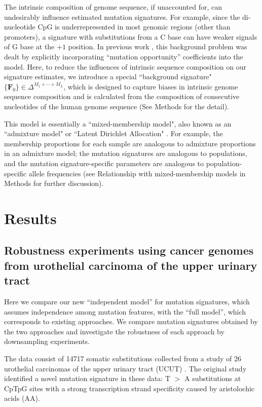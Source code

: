 \documentclass[10pt,letterpaper]{article}
\begin{document}
The intrinsic composition of genome sequence, if unaccounted for, can undesirably influence estimated mutation signatures.
For example, since the di-nucleotide CpG is underrepresented in most genomic regions (other than promoters), 
a signature with substitutions from a C base can have weaker signals of G base at the $+1$ position.
In previous work \cite{pmid23628380}, this background problem was dealt by explicitly incorporating ``mutation opportunity'' coefficients into the model.
Here, to reduce the influences of intrinsic sequence composition on our signature estimates, we introduce a special ``background signature"
$\{ \bm{F}_{0} \} \in \Delta^{M_1 \times \cdots \times M_L}$, 
which is designed to capture biases in intrinsic genome sequence composition and is calculated from the composition of consecutive nucleotides of the human genome sequence 
(See Methods for the detail).

This model is essentially a ``mixed-membership model", also known as an ``admixture model" \cite{pmid10835412} or ``Latent Dirichlet Allocation" \cite{Blei:2003}. For example,
the membership proportions for each sample are analogous to admixture proportions in an admixture model; the mutation signatures are analogous to 
populations, and the mutation signature-specific parameters are analogous to population-specific allele frequencies
(see Relationship with mixed-membership models in Methods for further discussion).

\section*{Results}


\subsection*{Robustness experiments using cancer genomes from urothelial carcinoma of the upper urinary tract}

Here we compare our new ``independent model'' for 
mutation signatures, which assumes independence
among mutation features,
with the ``full model'', which corresponds to existing approaches. We compare mutation signatures obtained by the two approaches and investigate the robustness of each approach by downsampling experiments.

The data consist of 14717 somatic substitutions 
collected from a study of 26 urothelial carcinomas of the upper urinary tract (UCUT) \cite{pmid23926200}.
The original study identified a novel mutation signature in these data: 
T $>$ A substitutions at CpTpG sites with a strong transcription strand specificity caused by aristolochic acids (AA).
\end{document}
